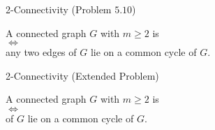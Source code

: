\begin{frame}{}
  \begin{exampleblock}{2-Connectivity (Problem $5.10$)}
    \begin{center}
      A connected graph $G$ with $m \ge 2$ is  \\[3pt]
      $\iff$ \\[3pt]
      any two  edges of $G$ lie on a common cycle of $G$.
    \end{center}
  \end{exampleblock}

  \pause
  \vspace{0.60cm}
  \begin{exampleblock}{2-Connectivity (Extended Problem)}
    \begin{center}
      A connected graph $G$ with $m \ge 2$ is  \\[3pt]
      $\iff$ \\[3pt]
       of $G$ lie on a common cycle of $G$.
    \end{center}
  \end{exampleblock}
\end{frame}
